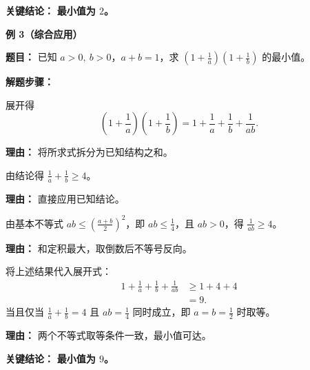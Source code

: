 \begin{examplebox}
	\textbf{\textcolor{CExample}{关键结论：}}
	\textbf{最小值为 $2$。}
	\medskip

	\textbf{\textcolor{CExample}{例 3（综合应用）}}

	\textbf{\textcolor{CExample}{题目：}}
	已知 $a>0,\ b>0$，$a+b=1$，求 $(1+\frac1a)(1+\frac1b)$ 的最小值。

	\textbf{\textcolor{CExample}{解题步骤：}}
	\begin{description}[style=nextline, leftmargin=2.8em, labelsep=0.5em, itemsep=0.45em]
		\item[\textbf{第一步（展开乘积）：}] 展开得
			\[
				(1+\frac1a)(1+\frac1b)=1+\frac1a+\frac1b+\frac1{ab}.
			\]
			\par\textbf{理由：} 将所求式拆分为已知结构之和。
		\item[\textbf{第二步（倒数和取值）：}] 由结论得 $\frac1a+\frac1b\ge4$。
			\par\textbf{理由：} 直接应用已知结论。
		\item[\textbf{第三步（积最值）：}] 由基本不等式 $ab\le\left(\frac{a+b}{2}\right)^2$，即 $ab\le\frac14$，且 $ab>0$，得 $\frac1{ab}\ge4$。
			\par\textbf{理由：} 和定积最大，取倒数后不等号反向。
		\item[\textbf{第四步（合并求最值）：}] 将上述结果代入展开式：
			\[
				\begin{aligned}
					1+\frac1a+\frac1b+\frac1{ab} &\ge 1+4+4 \\
					&= 9.
			\end{aligned}
			\]
			当且仅当 $\frac1a+\frac1b=4$ 且 $ab=\frac14$ 同时成立，即 $a=b=\frac12$ 时取等。
			\par\textbf{理由：} 两个不等式取等条件一致，最小值可达。
	\end{description}

	\textbf{\textcolor{CExample}{关键结论：}}
	\textbf{最小值为 $9$。}
\end{examplebox}
